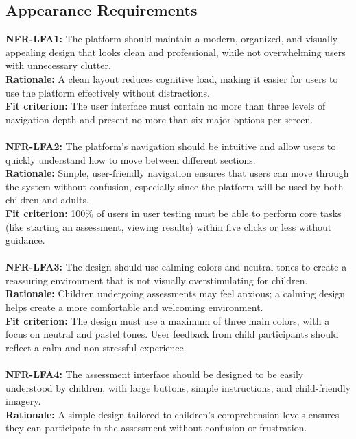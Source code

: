 \documentclass[12pt]{article}
\begin{document}
\subsection{Appearance Requirements}
\textbf{NFR-LFA1: }The platform should maintain a modern, organized, and visually appealing design that looks clean and professional, while not overwhelming users with unnecessary clutter.\\
\textbf{Rationale: }A clean layout reduces cognitive load, making it easier for users to use the platform effectively without distractions.\\
\textbf{Fit criterion: }The user interface must contain no more than three levels of navigation depth and present no more than six major options per screen.\\\\
\textbf{NFR-LFA2: }The platform’s navigation should be intuitive and allow users to quickly understand how to move between different sections.\\
\textbf{Rationale: }Simple, user-friendly navigation ensures that users can move through the system without confusion, especially since the platform will be used by both children and adults.\\
\textbf{Fit criterion: }100\% of users in user testing must be able to perform core tasks (like starting an assessment, viewing results) within five clicks or less without guidance.\\\\
\textbf{NFR-LFA3: }The design should use calming colors and neutral tones to create a reassuring environment that is not visually overstimulating for children.\\
\textbf{Rationale: }Children undergoing assessments may feel anxious; a calming design helps create a more comfortable and welcoming environment.\\
\textbf{Fit criterion: }The design must use a maximum of three main colors, with a focus on neutral and pastel tones. User feedback from child participants should reflect a calm and non-stressful experience.\\\\
\textbf{NFR-LFA4: }The assessment interface should be designed to be easily understood by children, with large buttons, simple instructions, and child-friendly imagery.\\
\textbf{Rationale: }A simple design tailored to children’s comprehension levels ensures they can participate in the assessment without confusion or frustration.\\
\end{document}
